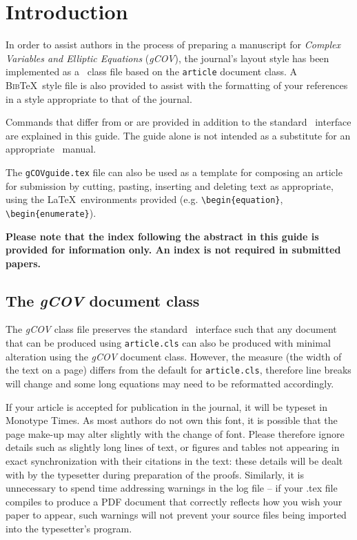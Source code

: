 \documentclass{gCOV2e}
\theoremstyle{plain}%
\theoremstyle{definition}
\theoremstyle{remark}
\begin{document}
\section{Introduction}

In order to assist authors in the process of preparing a manuscript for \textit{Complex Variables and Elliptic Equations} (\textit{gCOV}), the journal's layout style has been implemented as a \LaTeXe\ class file based on the \texttt{article} document class. A \textsc{Bib}\TeX\ style file is also provided to assist with the formatting of your references in a style appropriate to that of the journal.

Commands that differ from or are provided in addition to the standard \LaTeXe\ interface are explained in this guide. The guide alone is not intended as a substitute for an appropriate \LaTeXe\ manual.

The \texttt{gCOVguide.tex} file can also be used as a template for composing an article for submission by cutting, pasting, inserting and
deleting text as appropriate, using the \LaTeX\ environments provided (e.g. \verb"\begin{equation}", \verb"\begin{enumerate}").

\textbf{Please note that the index following the abstract in this guide is provided for information only. An index is not required in submitted papers.}


\subsection{The \textit{gCOV} document class}\label{class}

The \textit{gCOV} class file preserves the standard \LaTeXe\ interface such that any document that can
be produced using \texttt{article.cls} can also be produced with minimal alteration using the \textit{gCOV} document class.
However, the measure (the width of the text on a page) differs from the default for \texttt{article.cls}, therefore line breaks
will change and some long equations may need to be reformatted accordingly.

If your article is accepted for publication in the journal, it will be typeset in Monotype Times. As most authors do not own this font, it is possible that the page make-up may alter slightly with the change of font. Please therefore ignore details such as slightly long lines of text, or figures and tables not appearing in exact synchronization with their citations in the text: these details will be dealt with by the typesetter during preparation of the proofs. Similarly, it is unnecessary to spend time addressing warnings in the log file -- if your .tex file compiles to produce a PDF document that correctly reflects how you wish your paper to appear, such warnings will not prevent your source files being imported into the typesetter's program.
\end{document}
